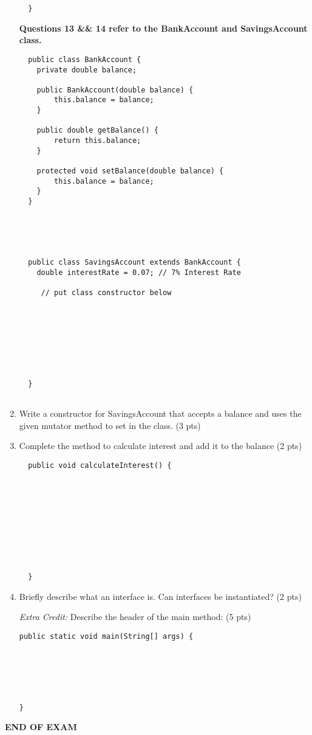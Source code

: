\documentclass[11pt,fleqn]{article}
\begin{document}
\begin{enumerate}
\begin{verbatim}
  }
  \end{verbatim}

\newpage

\textbf{Questions 13 \&\& 14 refer to the BankAccount and SavingsAccount class.}

  \begin{verbatim}
  public class BankAccount {
  	private double balance;

  	public BankAccount(double balance) {
  		this.balance = balance;
  	}

  	public double getBalance() {
  		return this.balance;
  	}

  	protected void setBalance(double balance) {
  		this.balance = balance;
  	}
  }





  public class SavingsAccount extends BankAccount {
  	double interestRate = 0.07; // 7% Interest Rate

	 // put class constructor below








  }


  \end{verbatim}

\item Write a constructor for SavingsAccount that accepts a balance and uses the given mutator method to set  in the  class. (3 pts)

\vspace{16ex}

\item Complete the method to calculate interest and add it to the balance (2 pts)
  \begin{verbatim}
  public void calculateInterest() {










  }
  \end{verbatim}
\item Briefly describe what an interface is. Can interfaces be instantiated? (2 pts)


\vspace{32ex}


\textit{Extra Credit:} Describe the header of the main method: (5 pts)
\begin{verbatim}
public static void main(String[] args) {






}
\end{verbatim}





\end{enumerate}
\vfill
	\begin{center}
		\textbf{END OF EXAM}
	\end{center}
\end{document}
